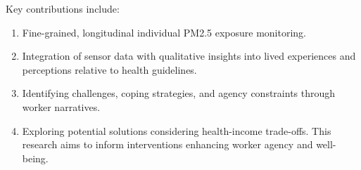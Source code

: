 Key contributions include:
\begin{enumerate}
    \item 
Fine-grained, longitudinal individual PM2.5 exposure monitoring.
    \item 
Integration of sensor data with qualitative insights into lived experiences and perceptions relative to health guidelines.
    \item 
Identifying challenges, coping strategies, and agency constraints through worker narratives.
    \item 
Exploring potential solutions considering health-income trade-offs. This research aims to inform interventions enhancing worker agency and well-being.
\end{enumerate}

